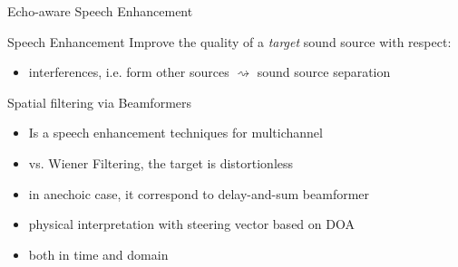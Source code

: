 \begin{frame}{Echo-aware Speech Enhancement}
    \begin{block}{Speech Enhancement}
        Improve the quality of a \textit{target} sound source with respect:
        \begin{itemize}
            \item interferences, i.e. form other sources $\rightsquigarrow$ sound source separation
        \end{itemize}
    \end{block}

    \begin{block}{Spatial filtering via Beamformers}
        \begin{itemize}
            \item Is a speech enhancement techniques for multichannel
            \item vs. Wiener Filtering, the target is distortionless
            \item in anechoic case, it correspond to delay-and-sum beamformer
            \item physical interpretation with steering vector based on DOA
            \item both in time and  domain
        \end{itemize}
    \end{block}

\end{frame}

